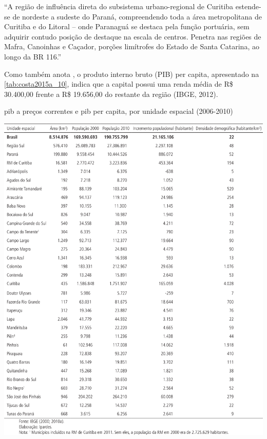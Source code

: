 	\begin{citacao}
		``A região de influência direta do subsistema urbano-regional de Curitiba estende-se de nordeste a sudeste do Paraná, compreendendo toda a área metropolitana de Curitiba e do Litoral – onde Paranaguá se destaca pela função portuária, sem adquirir contudo posição de destaque na escala de centros. Penetra nas regiões de Mafra, Canoinhas e Caçador, porções limítrofes do Estado de Santa Catarina, ao longo da BR 116.'' \cite[p. 43]{moura2001a}
	\end{citacao}
	
	Como também anota , o produto interno bruto (PIB) per capita, apresentado na \autoref{tab:costa2015a_10}, indica que a capital possui uma renda média de R\$ 30.400,00 frente a R\$ 19.656,00 do restante da região (IBGE, 2012).
	
	\begin{table}
		\centering
		\caption{\gls{pib} a preços correntes e \gls{pib} per capita, por unidade espacial (2006-2010)}
		\includegraphics[width=1.0\linewidth]{img/costa2015a_10}
		\label{tab:costa2015a_10}
	\end{table}

